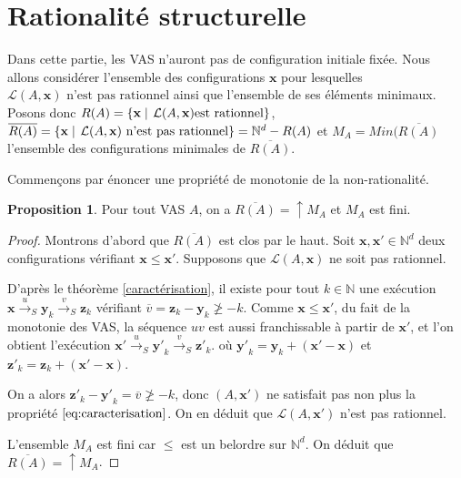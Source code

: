 \documentclass[a4paper,final]{article}
\theoremstyle{definition}
\newtheorem{Proposition}[Theorem]{Proposition}
\let\leq\leqslant
\let\geq\geqslant
\newcommand{\alain}[1]{\textcolor{blue}{#1}}
\newcommand{\lucas}[1]{\textcolor{olive}{#1}}
\newcommand{\set}[2]{\left\{#1\mathrel{\left|\vphantom{#1}\vphantom{#2}\right.}#2\right\}}
\newcommand{\N}{\ensuremath{\mathbb{N}}}
\newcommand{\lang}{\ensuremath{\mathcal{L}}}
\newcommand{\trans}[2]{\ensuremath{\stackrel{#1}{\longrightarrow}_{#2}}}
\newcommand{\vect}[1]{\ensuremath{\mathbf{#1}}}
\newcommand{\valeur}[1]{\ensuremath{\overline{#1}}}
\begin{document}

\section{Rationalité structurelle}

Dans cette partie, les VAS n'auront pas de configuration initiale fixée.
Nous allons considérer l'ensemble des configurations  $\vect{x}$ pour lesquelles ${\lang(A,\vect{x}) \text{ n'est pas rationnel}}$ ainsi que l'ensemble de ses éléments minimaux.
Posons donc	 $R(A)=\set{\vect{x}}{\lang(A,\vect{x}) \text{est rationnel}}$, $\overline{R(A)}  = \set{\vect{x}}{\lang(A,\vect{x}) \text{ n'est pas rationnel}}  
=\N^d-R(A)$ et $M_A=Min(\overline{R(A)}$  l'ensemble des configurations minimales de $\overline{R(A)}$.


Commençons par énoncer une propriété de monotonie de la non-rationalité.

\begin{Proposition}\label{monotonie_rationnel}
Pour tout VAS $A$, 
on a $\overline{R(A)}=\uparrow M_A$ et $M_A$ est fini.
\end{Proposition}


\begin{proof}
Montrons d'abord que $\overline{R(A)}$ est clos par le haut. Soit $\vect{x},\vect{x'}\in\N^d$ deux configurations vérifiant $\vect{x} \leq \vect{x'}$.
Supposons que $\lang(A,\vect{x})$ ne soit pas rationnel.

D'après le théorème \ref{caractérisation}, il existe pour tout $k\in\N$ une exécution $\vect{x} \trans{u}{S} \vect{y}_k \trans{v}{S} \vect{z}_k$ vérifiant $\valeur{v} = \vect{z}_k - \vect{y}_k \not\geq -k$.
Comme $\vect{x}\leq\vect{x'}$, du fait de la monotonie des VAS, la séquence $uv$ est aussi franchissable à partir de $\vect{x'}$, et l'on obtient l'exécution $\vect{x'} \trans{u}{S} \vect{y'}_k \trans{v}{S} \vect{z'}_k$.
où $\vect{y'}_k = \vect{y}_k + (\vect{x'} - \vect{x})$ et $\vect{z'}_k = \vect{z}_k + (\vect{x'} - \vect{x})$.

On a alors $\vect{z'}_k - \vect{y'}_k = \valeur{v} \not\geq -k$, donc $(A,\vect{x'})$ ne satisfait pas non plus la propriété $\eqref{eq:caracterisation}$.
On en déduit que $\lang(A,\vect{x'})$ n'est pas rationnel.

L'ensemble $M_A$ est fini car $\leq$ est un belordre sur $\N^d$. On déduit que $\overline{R(A)}=\uparrow M_A$.
\end{proof}
\end{document}
